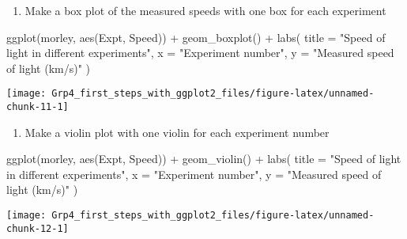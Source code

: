 \documentclass[
]{article}
\newenvironment{Shaded}{\begin{snugshade}}{\end{snugshade}}
\newcommand{\AttributeTok}[1]{\textcolor[rgb]{0.77,0.63,0.00}{#1}}
\newcommand{\FunctionTok}[1]{\textcolor[rgb]{0.00,0.00,0.00}{#1}}
\newcommand{\NormalTok}[1]{#1}
\newcommand{\SpecialCharTok}[1]{\textcolor[rgb]{0.00,0.00,0.00}{#1}}
\newcommand{\StringTok}[1]{\textcolor[rgb]{0.31,0.60,0.02}{#1}}
\providecommand{\tightlist}{%
  \setlength{\itemsep}{0pt}\setlength{\parskip}{0pt}}
\begin{document}
\begin{enumerate}
\def\labelenumi{(\alph{enumi})}
\setcounter{enumi}{4}
\tightlist
\item
  Make a box plot of the measured speeds with one box for each
  experiment
\end{enumerate}

\begin{Shaded}
\begin{Highlighting}[]
  \FunctionTok{ggplot}\NormalTok{(morley, }\FunctionTok{aes}\NormalTok{(Expt, Speed)) }\SpecialCharTok{+} 
  \FunctionTok{geom\_boxplot}\NormalTok{() }\SpecialCharTok{+}
  \FunctionTok{labs}\NormalTok{(}
    \AttributeTok{title =} \StringTok{"Speed of light in different experiments"}\NormalTok{,}
    \AttributeTok{x =} \StringTok{"Experiment number"}\NormalTok{,}
    \AttributeTok{y =} \StringTok{"Measured speed of light (km/s)"}
\NormalTok{  )}
\end{Highlighting}
\end{Shaded}

\begin{center}\texttt{[image: Grp4\_first\_steps\_with\_ggplot2\_files/figure-latex/unnamed-chunk-11-1]} \end{center}

\begin{enumerate}
\def\labelenumi{(\alph{enumi})}
\setcounter{enumi}{5}
\tightlist
\item
  Make a violin plot with one violin for each experiment number
\end{enumerate}

\begin{Shaded}
\begin{Highlighting}[]
  \FunctionTok{ggplot}\NormalTok{(morley, }\FunctionTok{aes}\NormalTok{(Expt, Speed)) }\SpecialCharTok{+} 
  \FunctionTok{geom\_violin}\NormalTok{() }\SpecialCharTok{+}
  \FunctionTok{labs}\NormalTok{(}
    \AttributeTok{title =} \StringTok{"Speed of light in different experiments"}\NormalTok{,}
    \AttributeTok{x =} \StringTok{"Experiment number"}\NormalTok{,}
    \AttributeTok{y =} \StringTok{"Measured speed of light (km/s)"}
\NormalTok{  )}
\end{Highlighting}
\end{Shaded}

\begin{center}\texttt{[image: Grp4\_first\_steps\_with\_ggplot2\_files/figure-latex/unnamed-chunk-12-1]} \end{center}
\end{document}
